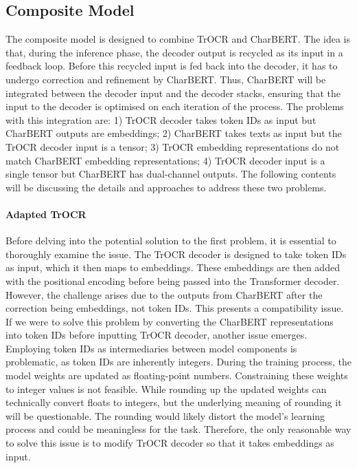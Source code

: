 \subsection{Composite Model}
\label{subsec:3_composite_model}
The composite model is designed to combine TrOCR and CharBERT. The idea is that, during the inference phase, the decoder output is recycled as its input in a feedback loop. Before this recycled input is fed back into the decoder, it has to undergo correction and refinement by CharBERT. Thus, CharBERT will be integrated between the decoder input and the decoder stacks, ensuring that the input to the decoder is optimised on each iteration of the process. The problems with this integration are: 1) TrOCR decoder takes token IDs as input but CharBERT outputs are embeddings; 2) CharBERT takes texts as input but the TrOCR decoder input is a tensor; 3) TrOCR embedding representations do not match CharBERT embedding representations; 4) TrOCR decoder input is a single tensor but CharBERT has dual-channel outputs. The following contents will be discussing the details and approaches to address these two problems.

\paragraph*{Adapted TrOCR}
\label{par:3_adapted_trocr}
Before delving into the potential solution to the first problem, it is essential to thoroughly examine the issue. The TrOCR decoder is designed to take token IDs as input, which it then maps to embeddings. These embeddings are then added with the positional encoding before being passed into the Transformer decoder. However, the challenge arises due to the outputs from CharBERT after the correction being embeddings, not token IDs. This presents a compatibility issue. If we were to solve this problem by converting the CharBERT representations into token IDs before inputting TrOCR decoder, another issue emerges. Employing token IDs as intermediaries between model components is problematic, as token IDs are inherently integers. During the training process, the model weights are updated as floating-point numbers. Constraining these weights to integer values is not feasible. While rounding up the updated weights can technically convert floats to integers, but the underlying meaning of rounding it will be questionable. The rounding would likely distort the model's learning process and could be meaningless for the task. Therefore, the only reasonable way to solve this issue is to modify TrOCR decoder so that it takes embeddings as input. 

